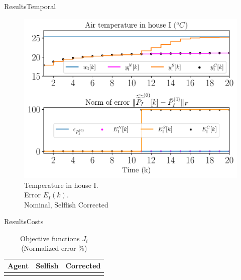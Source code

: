 \documentclass[aspectratio=169]{beamer}
\begin{document}
\begin{frame}{Results}{Temporal}
  \centering
  \begin{overlayarea}{1\textwidth}{.5\textwidth}
  \begin{figure}[h]
    \centering
    \includegraphics[width=.45\textwidth,trim=0 .3cm 0 .2cm,clip]{../img/resilient_ineq/ErrorWX_command_normErrH.pdf}
    \caption*{Temperature in house I. \\Error  $E_{I}(k)$.\\ {} Nominal, {} Selflish {} Corrected}
  \end{figure}


  \end{overlayarea}

\end{frame}

\begin{frame}{Results}{Costs}
  \begin{table}[h]
    \centering
    \caption*{Objective functions $J_{i}$ (Normalized error \%)}\label{tab:eq_costsGlobalLocal}
    \begin{tabular}[t]{crr}
      \toprule
      Agent  & Selfish & Corrected\\
      \midrule
      \\
      \bottomrule
    \end{tabular}
  \end{table}
\end{frame}
\end{document}

